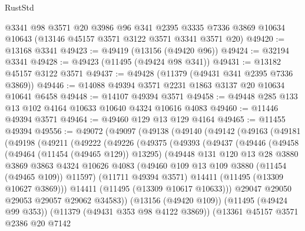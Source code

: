 \begin{lexlean}{RustStd}
\begin{coremodule}
    @3341
    @98
    @3571
    @20
    @3986
    @96
    @341
    @2395
    @3335
    @7336
    @3869
    @10634
    @10643
    (@13146 @45157 @3571 @3122 @3571 @3341 @3571 @20)
@49420 := @13168 @3341
@49423 := @49419 (@13156 (@49420 @96))
@49424 := @32194 @3341
@49428 := @49423 (@11495 (@49424 @98 @341))
@49431 := @13182 @45157 @3122 @3571
@49437 := @49428 (@11379 (@49431 @341 @2395 @7336 @3869))
@49446 := @14088 @49394 @3571 @2231 @1863 @3137 @20 @10634 @10641 @6458
@49448 := @14107 @49394 @3571
@49458 := @49448 @285 @133 @13 @102 @4164 @10633 @10640 @4324 @10616 @4083
@49460 := @11446 @49394 @3571
@49464 := @49460 @129 @13 @129 @4164
@49465 := @11455 @49394
@49556 := @49072
    (@49097
      (@49138
        (@49140
          (@49142
            (@49163
              (@49181
                (@49198
                  (@49211
                    (@49222
                      (@49226
                        (@49375
                          (@49393
                            (@49437
                              (@49446
                                (@49458
                                  (@49464 (@11454 (@49465 @129)) @13295)
                                  (@49448
                                    @131
                                    @120
                                    @13
                                    @28
                                    @3880
                                    @3869
                                    @3863
                                    @4324
                                    @10626
                                    @4083
                                    (@49460 @109 @13 @109 @3880 (@11454 (@49465 @109)) @11597)
                                    (@11711 @49394 @3571)
                                    @14411
                                    (@11495 (@13309 @10627 @3869)))
                                  @14411
                                  (@11495 (@13309 @10617 @10633)))
                                @29047
                                @29050
                                @29053
                                @29057
                                @29062
                                @34583))
                            (@13156 (@49420 @109))
                            (@11495 (@49424 @99 @353))
                            (@11379 (@49431 @353 @98 @4122 @3869))
                            (@13361
                              @45157
                              @3571
                              @2386
                              @20
                              @7142

\end{coremodule}
\end{lexlean}
